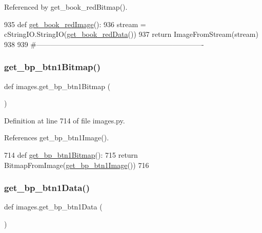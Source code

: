 Referenced by get\+\_\+book\+\_\+red\+Bitmap().


\begin{DoxyCode}
935 \textcolor{keyword}{def }\hyperlink{namespaceimages_a0e1759b6e5c78ef3b1f0b39fc7348e80}{get\_book\_redImage}():
936     stream = cStringIO.StringIO(\hyperlink{namespaceimages_a1d69045b3511549861c0100d3448f9a6}{get\_book\_redData}())
937     \textcolor{keywordflow}{return} ImageFromStream(stream)
938 
939 \textcolor{comment}{#----------------------------------------------------------------------}
\end{DoxyCode}
\mbox{\label{namespaceimages_a8ad1325727a339e62cd7c2c882c6bb55}} 
\subsubsection{\texorpdfstring{get\+\_\+bp\+\_\+btn1\+Bitmap()}{get\_bp\_btn1Bitmap()}}
{\footnotesize\ttfamily def images.\+get\+\_\+bp\+\_\+btn1\+Bitmap (\begin{DoxyParamCaption}{ }\end{DoxyParamCaption})}



Definition at line 714 of file images.\+py.



References get\+\_\+bp\+\_\+btn1\+Image().


\begin{DoxyCode}
714 \textcolor{keyword}{def }\hyperlink{namespaceimages_a8ad1325727a339e62cd7c2c882c6bb55}{get\_bp\_btn1Bitmap}():
715     \textcolor{keywordflow}{return} BitmapFromImage(\hyperlink{namespaceimages_a6ad3dea5ab1384aff783408f19431425}{get\_bp\_btn1Image}())
716 
\end{DoxyCode}
\mbox{\label{namespaceimages_a1abc60ad61025fe5c4e73413d2d60281}} 
\subsubsection{\texorpdfstring{get\+\_\+bp\+\_\+btn1\+Data()}{get\_bp\_btn1Data()}}
{\footnotesize\ttfamily def images.\+get\+\_\+bp\+\_\+btn1\+Data (\begin{DoxyParamCaption}{ }\end{DoxyParamCaption})}



